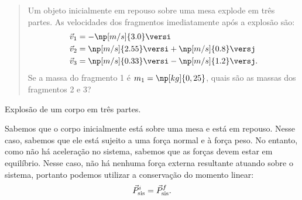 \begin{quote}
    Um objeto inicialmente em repouso sobre uma mesa explode em três partes. As velocidades dos fragmentos imediatamente após a explosão são:
\begin{align}
    \vec{v}_1 &= -\np[m/s]{3.0} \versi\\
    \vec{v}_2 &= \np[m/s]{2.55} \versi + \np[m/s]{0.8} \versj \\
    \vec{v}_3 &= \np[m/s]{0.33} \versi - \np[m/s]{1.2} \versj.
\end{align}
%
Se a massa do fragmento 1 é $m_1 = \np[kg]{0,25}$, quais são as massas dos fragmentos 2 e 3?
\end{quote}

\begin{marginfigure}
\centering
{}
\caption{Explosão de um corpo em três partes.}
\end{marginfigure}

Sabemos que o corpo inicialmente está sobre uma mesa e está em repouso. Nesse caso, sabemos que ele está sujeito a uma força normal e à força peso. No entanto, como não há aceleração no sistema, sabemos que as forças devem estar em equilíbrio. Nesse caso, não há nenhuma força externa resultante atuando sobre o sistema, portanto podemos utilizar a conservação do momento linear:
\begin{equation}
    \vec{P}_{\rm{sis}}^i = \vec{P}_{\rm{sis}}^f.
\end{equation}

